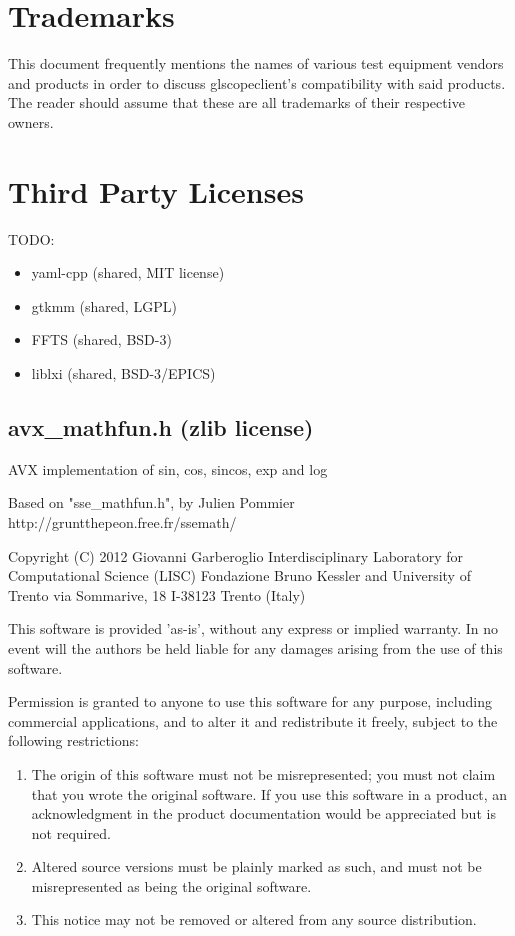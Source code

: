 \section{Trademarks}

This document frequently mentions the names of various test equipment vendors and products in order to discuss
glscopeclient's compatibility with said products. The reader should assume that these are all trademarks of their
respective owners.

\section{Third Party Licenses}

TODO:
\begin{itemize}
\item yaml-cpp (shared, MIT license)
\item gtkmm (shared, LGPL)
\item FFTS (shared, BSD-3)
\item liblxi (shared, BSD-3/EPICS)
\end{itemize}

\subsection{avx\_mathfun.h (zlib license)}

AVX implementation of sin, cos, sincos, exp and log

Based on "sse\_mathfun.h", by Julien Pommier
http://gruntthepeon.free.fr/ssemath/

Copyright (C) 2012 Giovanni Garberoglio
Interdisciplinary Laboratory for Computational Science (LISC)
Fondazione Bruno Kessler and University of Trento
via Sommarive, 18
I-38123 Trento (Italy)

This software is provided 'as-is', without any express or implied
warranty.  In no event will the authors be held liable for any damages
arising from the use of this software.

Permission is granted to anyone to use this software for any purpose,
including commercial applications, and to alter it and redistribute it
freely, subject to the following restrictions:

\begin{enumerate}
\item The origin of this software must not be misrepresented; you must not
claim that you wrote the original software. If you use this software
in a product, an acknowledgment in the product documentation would be
appreciated but is not required.
\item Altered source versions must be plainly marked as such, and must not be
misrepresented as being the original software.
\item This notice may not be removed or altered from any source distribution.
\end{enumerate}
